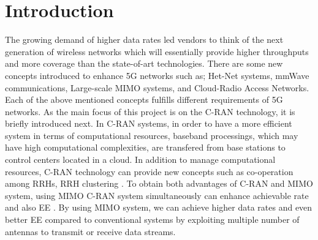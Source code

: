 \documentclass[journal,onecolumn,11pt,draftcls,doublespace]{IEEEtran}
\begin{document}
\section{Introduction}
The growing demand of higher data rates led vendors to think of the next generation of wireless networks which will essentially provide higher throughputs and more coverage than the state-of-art technologies. There are some new concepts introduced to enhance 5G networks such as; Het-Net systems, mmWave communications, Large-scale MIMO systems, and Cloud-Radio Access Networks. Each of the above mentioned concepts fulfills different requirements of 5G networks. As the main focus of this project is on the C-RAN technology, it is briefly introduced next. In C-RAN systems, in order to have a more efficient system in terms of computational resources, baseband processings, which may have high computational complexities, are transfered from base stations to control centers located in a cloud. In addition to manage computational resources, C-RAN technology can provide new concepts such as co-operation among RRHs, RRH clustering \cite{33,55}. To obtain both advantages of C-RAN and MIMO system, using MIMO C-RAN system simultaneously can enhance achievable rate and also EE \cite{33}. By using MIMO system, we can achieve higher data rates and even better EE compared to conventional systems by exploiting multiple number of antennas to transmit or receive data streams.
\end{document}

